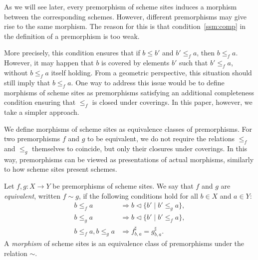 \documentclass[reqno]{amsart}
\theoremstyle{definition}
\theoremstyle{remark}
\numberwithin{figure}{section}
\newcommand{\cover}{\triangleleft}
\begin{document}
As we will see later, every premorphism of scheme sites induces a morphism between the corresponding schemes.
However, different premorphisms may give rise to the same morphism.
The reason for this is that condition~\eqref{ssm:comp} in the definition of a premorphism is too weak.

More precisely, this condition ensures that if $b \leq b'$ and $b' \leq_f a$, then $b \leq_f a$.
However, it may happen that $b$ is covered by elements $b'$ such that $b' \leq_f a$, without $b \leq_f a$ itself holding.
From a geometric perspective, this situation should still imply that $b \leq_f a$.
One way to address this issue would be to define morphisms of scheme sites as premorphisms satisfying an additional completeness condition ensuring that $\leq_f$ is closed under coverings.
In this paper, however, we take a simpler approach.

We define morphisms of scheme sites as equivalence classes of premorphisms.
For two premorphisms $f$ and $g$ to be equivalent, we do not require the relations $\leq_f$ and $\leq_g$ themselves to coincide, but only their closures under coverings.
In this way, premorphisms can be viewed as presentations of actual morphisms, similarly to how scheme sites present schemes.

\begin{defn}
Let $f,g : X \to Y$ be premorphisms of scheme sites.
We say that $f$ and $g$ are \emph{equivalent}, written $f \sim g$, if the following conditions hold for all $b \in X$ and $a \in Y$:
\begin{align*}
b \leq_f a & \Rightarrow b \cover \{ b' \mid b' \leq_g a \}, \\
b \leq_g a & \Rightarrow b \cover \{ b' \mid b' \leq_f a \}, \\
b \leq_f a, b \leq_g a & \Rightarrow f^\sharp_{b,a} = g^\sharp_{b,a}.
\end{align*}
A \emph{morphism} of scheme sites is an equivalence class of premorphisms under the relation $\sim$.
\end{defn}
\end{document}
